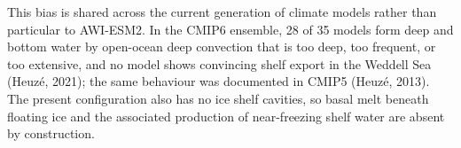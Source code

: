 This bias is shared across the current generation of climate models rather than particular to AWI-ESM2. In the CMIP6 ensemble, 28 of 35 models form deep and bottom water by open-ocean deep convection that is too deep, too frequent, or too extensive, and no model shows convincing shelf export in the Weddell Sea (Heuzé, 2021); the same behaviour was documented in CMIP5 (Heuzé, 2013). The present configuration also has no ice shelf cavities, so basal melt beneath floating ice and the associated production of near-freezing shelf water are absent by construction.